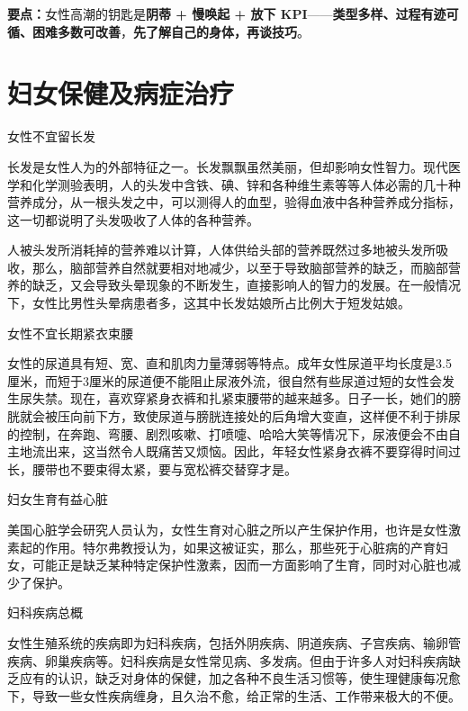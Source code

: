 \documentclass[12pt,UTF8,openany]{ctexbook}
\begin{document}
\vspace{1em}
\noindent\textbf{要点：}女性高潮的钥匙是\textbf{阴蒂 + 慢唤起 + 放下 KPI}——\textbf{类型多样、过程有迹可循、困难多数可改善}，\textbf{先了解自己的身体，再谈技巧}。

\chapter{妇女保健及病症治疗}


女性不宜留长发


长发是女性人为的外部特征之一。长发飘飘虽然美丽，但却影响女性智力。现代医学和化学测验表明，人的头发中含铁、碘、锌和各种维生素等等人体必需的几十种营养成分，从一根头发之中，可以测得人的血型，验得血液中各种营养成分指标，这一切都说明了头发吸收了人体的各种营养。

人被头发所消耗掉的营养难以计算，人体供给头部的营养既然过多地被头发所吸收，那么，脑部营养自然就要相对地减少，以至于导致脑部营养的缺乏，而脑部营养的缺乏，又会导致头晕现象的不断发生，直接影响人的智力的发展。在一般情况下，女性比男性头晕病患者多，这其中长发姑娘所占比例大于短发姑娘。





女性不宜长期紧衣束腰


女性的尿道具有短、宽、直和肌肉力量薄弱等特点。成年女性尿道平均长度是3.5厘米，而短于3厘米的尿道便不能阻止尿液外流，很自然有些尿道过短的女性会发生尿失禁。现在，喜欢穿紧身衣裤和扎紧束腰带的越来越多。日子一长，她们的膀胱就会被压向前下方，致使尿道与膀胱连接处的后角增大变直，这样便不利于排尿的控制，在奔跑、弯腰、剧烈咳嗽、打喷嚏、哈哈大笑等情况下，尿液便会不由自主地流出来，这当然令人既痛苦又烦恼。因此，年轻女性紧身衣裤不要穿得时间过长，腰带也不要束得太紧，要与宽松裤交替穿才是。





妇女生育有益心脏


美国心脏学会研究人员认为，女性生育对心脏之所以产生保护作用，也许是女性激素起的作用。特尔弗教授认为，如果这被证实，那么，那些死于心脏病的产育妇女，可能正是缺乏某种特定保护性激素，因而一方面影响了生育，同时对心脏也减少了保护。





妇科疾病总概


女性生殖系统的疾病即为妇科疾病，包括外阴疾病、阴道疾病、子宫疾病、输卵管疾病、卵巢疾病等。妇科疾病是女性常见病、多发病。但由于许多人对妇科疾病缺乏应有的认识，缺乏对身体的保健，加之各种不良生活习惯等，使生理健康每况愈下，导致一些女性疾病缠身，且久治不愈，给正常的生活、工作带来极大的不便。
\end{document}
